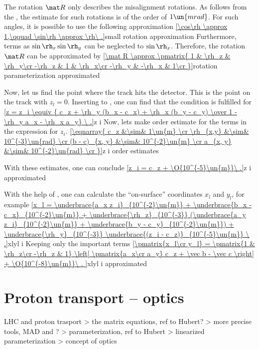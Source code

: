 \TODO{} The rotation $\mat R$ only describes the misalignment rotations. As follows from the , the estimate for such rotations is of the order of $1\un{mrad}$. For such angles, it is possible to use the following approximation
\eqref{\cos\rh \approx 1,\qquad \sin\rh \approx \rh\ .}{small rotation approximation}
Furthermore, terms as $\sin\rh_x \sin\rh_y$ can be neglected to $\sin\rh_x$. Therefore, the rotation $\mat R$ can be approximated by
\eqref{\mat R \approx \pmatrix{
1 & \rh_z & \rh_y\cr
-\rh_z & 1 & \rh_x\cr
-\rh_y & -\rh_x & 1\cr
}}{rotation parameterization approximated}


Now, let us find the point where the track  hits the detector. This is the point on the track with $z_l = 0$. Inserting  to , one can find that the condition is fulfilled for 
\eqref{z = z_i \equiv { c_z + \rh_y (b_x - c_x) + \rh_x (b_y - c_y) \over 1 - \rh_y a_x - \rh_x a_y} \ .}{z i}
Now, lets make order estimate for the terms in the expression for $z_i$.\hfil\break
\eqref{\eqnarray{
c_z &\sim& 1\un{m} \cr
\rh_{x,y} &\sim& 10^{-3}\un{rad} \cr
(b - c)_{x, y} &\sim& 10^{-2}\un{m} \cr
a_{x, y} &\sim& 10^{-2}\un{rad} \cr
}}{z i order estimates}

With these estimates, one can conclude
\eqref{z_i = c_z + \O{10^{-5}\un{m}}\ .}{z i approximated}

With the help of , one can calculate the ``on-surface'' coordinates $x_l$ and $y_l$, for example
\eqref{x_l = 
\underbrace{a_x z_i}_{10^{-2}\un{m}}
+ \underbrace{b_x - c_x}_{10^{-2}\un{m}} 
+ \underbrace{\rh_z}_{10^{-3}} (\underbrace{a_y z_i}_{10^{-2}\un{m}} + \underbrace{b_y - c_y}_{10^{-2}\un{m}})
+ \underbrace{\rh_y}_{10^{-3}} \underbrace{(z_i - c_z)}_{10^{-5}\un{m}}
\ .}{xlyl i}
Keeping only the important terms
\eqref{\pmatrix{x_l\cr y_l} = \pmatrix{1 & \rh_z\cr -\rh_z & 1}
\left[
\pmatrix{a_x\cr a_y} c_z + \vec b - \vec c
\right] + \O{10^{-8}\un{m}}\ .
}{xlyl i approximated}


\section[pr transport]{Proton transport -- optics}

\> LHC and proton trasport
\>> the matrix equations, ref to Hubert?
\>> more precise tools, MAD and ?
\>> parameterization, ref to Hubert
\>> linearized parameterization
\>> concept of optics


